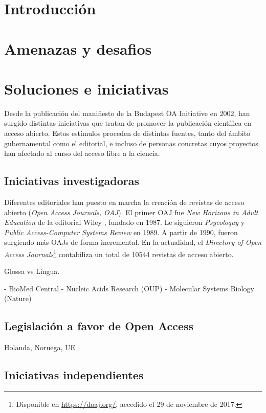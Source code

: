 \section{Introducción}
\section{Amenazas y desafios}
\section{Soluciones e iniciativas}

Desde la publicación del manifiesto de la Budapest OA Initiative \cite{boai} en 2002, han surgido distintas iniciativas que tratan de promover la publicación científica en acceso abierto. Estos estímulos proceden de distintas fuentes, tanto del ámbito gubernamental como el editorial, e incluso de personas concretas cuyos proyectos han afectado al curso del acceso libre a la ciencia.

\subsection{Iniciativas investigadoras}

Diferentes editoriales han puesto en marcha la creación de revistas de acceso abierto (\textit{Open Access Journals, OAJ}). El primer OAJ fue \textit{New Horizons in Adult Education} de la editorial Wiley \cite{earlyoaj}, fundado en 1987. Le siguieron \textit{Psycoloquy} y \textit{Public Access-Computer Systems Review} en 1989. A partir de 1990, fueron surgiendo más OAJs de forma incremental. En la actualidad, el \textit{Directory of Open Access Journals}\footnote{Disponible en \url{https://doaj.org/}, accedido el 29 de noviembre de 2017.} contabiliza un total de 10544 revistas de acceso abierto.

Glossa vs Lingua.

- BioMed Central
- Nucleic Acids Research (OUP)
- Molecular Systems Biology (Nature)

\subsection{Legislación a favor de Open Access}

Holanda, Noruega, UE \cite{enserink2016dramatic}

\subsection{Iniciativas independientes}

